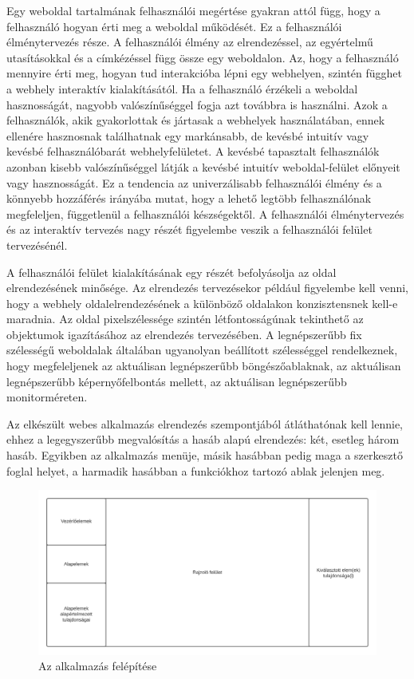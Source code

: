 

Egy weboldal tartalmának felhasználói megértése gyakran attól függ, hogy a felhasználó hogyan érti meg a weboldal működését. Ez a felhasználói élménytervezés része. A felhasználói élmény az elrendezéssel, az egyértelmű utasításokkal és a címkézéssel függ össze egy weboldalon. Az, hogy a felhasználó mennyire érti meg, hogyan tud interakcióba lépni egy webhelyen, szintén függhet a webhely interaktív kialakításától. Ha a felhasználó érzékeli a weboldal hasznosságát, nagyobb valószínűséggel fogja azt továbbra is használni. Azok a felhasználók, akik gyakorlottak és jártasak a webhelyek használatában, ennek ellenére hasznosnak találhatnak egy markánsabb, de kevésbé intuitív vagy kevésbé felhasználóbarát webhelyfelületet. A kevésbé tapasztalt felhasználók azonban kisebb valószínűséggel látják a kevésbé intuitív weboldal-felület előnyeit vagy hasznosságát. Ez a tendencia az univerzálisabb felhasználói élmény és a könnyebb hozzáférés irányába mutat, hogy a lehető legtöbb felhasználónak megfeleljen, függetlenül a felhasználói készségektől. A felhasználói élménytervezés és az interaktív tervezés nagy részét figyelembe veszik a felhasználói felület tervezésénél.


A felhasználói felület kialakításának egy részét befolyásolja az oldal elrendezésének minősége. Az elrendezés tervezésekor például figyelembe kell venni, hogy a webhely oldalelrendezésének a különböző oldalakon konzisztensnek kell-e maradnia. Az oldal pixelszélessége szintén létfontosságúnak tekinthető az objektumok igazításához az elrendezés tervezésében. A legnépszerűbb fix szélességű weboldalak általában ugyanolyan beállított szélességgel rendelkeznek, hogy megfeleljenek az aktuálisan legnépszerűbb böngészőablaknak, az aktuálisan legnépszerűbb képernyőfelbontás mellett, az aktuálisan legnépszerűbb monitorméreten.

Az elkészült webes alkalmazás elrendezés szempontjából átláthatónak kell lennie, ehhez a legegyszerűbb megvalósítás a hasáb alapú elrendezés: két, esetleg három hasáb. Egyikben az alkalmazás menüje, másik hasábban pedig maga a szerkesztő foglal helyet, a harmadik hasábban a funkciókhoz tartozó ablak jelenjen meg. 

\begin{figure}[!h]
	\includegraphics[width=\textwidth]{images/block.png}
	\caption{Az alkalmazás felépítése}
	\label{fig:block}
\end{figure}

